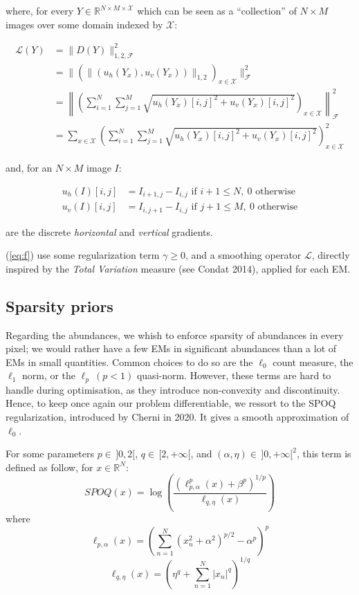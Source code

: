 \documentclass[conference]{IEEEtran}
\begin{document}
where, for every $Y \in \mathbb{R}^{N \times M \times \mathcal{X}}$ which can be seen as a ``collection'' of $N \times M$ images over some domain indexed by $\mathcal{X}$:

\begin{align}\label{eq:smoothing}
  \mathcal{L}(Y) &= \| D(Y) \|_{1,2,\mathcal{F}}^2\\
  &= \| \left( \| (u_h (Y_x), u_v (Y_x)) \|_{1,2} \right)_{x \in \mathcal{X}} \|_{\mathcal{F}}^2\\
  &= \left\| \left(\sum_{i=1}^N \sum_{j=1}^M \sqrt{ u_h (Y_{x})[i, j]^2 + u_v (Y_x)[i, j]^2 } \right)_{x \in \mathcal{X}} \right\|_{\mathcal{F}}^2\\
  &= \sum_{x \in \mathcal{X}} \left( \sum_{i=1}^N \sum_{j=1}^M \sqrt{ u_h (Y_{x})[i, j]^2 + u_v (Y_x)[i, j]^2 } \right)_{x \in \mathcal{X}}^2
\end{align}

and, for an $N \times M$ image $I$:

\begin{align}\label{eq:discrete-grad}
  u_h (I) [i, j] &= I_{i+1, j} - I_{i, j} \text{ if }i + 1 \leq N,\ 0 \text{ otherwise}\\
  u_v (I) [i, j] &= I_{i, j+1} - I_{i, j} \text{ if }j + 1 \leq M,\ 0 \text{ otherwise}
\end{align}

are the discrete \emph{horizontal} and \emph{vertical} gradients.

(\ref{eq:f}) use some regularization term $\gamma \geq 0$, and a smoothing operator $\mathcal{L}$, directly inspired by the \emph{Total Variation} measure (see Condat 2014), applied for each EM.

\subsection{Sparsity priors}

Regarding the abundances, we whish to enforce sparsity of abundances in every pixel; we would rather have a few EMs in significant abundances than a lot of EMs in small quantities. Common choices to do so are the $\ell_0$ count measure, the $\ell_1$ norm, or the $\ell_p \ (p<1)$ quasi-norm. However, these terms are hard to handle during optimisation, as they introduce non-convexity and discontinuity. Hence, to keep once again our problem differentiable, we ressort to the SPOQ regularization, introduced by Cherni in 2020. It gives a smooth approximation of $\ell_0$.

For some parameters $p\in \, ]0, 2[$, $q\in \, [2, +\infty[$, and $(\alpha, \eta) \in \, ]0, +\infty [^2$, this term is defined as follow, for $x \in \mathbb{R}^N$:
$$SPOQ(x) = \log \left( \frac{(\ell_{p,\alpha}^p (x) + \beta^p)^{1/p}}{\ell_{q,\eta} (x)} \right)$$
        where
        $$\ell_{p,\alpha} (x) = \left( \sum_{n=1}^N (x_n^2 + \alpha^2)^{p/2} - \alpha^p \right)^p$$
        $$\ell_{q,\eta} (x) = \left( \eta^q + \sum_{n=1}^N |x_n|^q \right)^{1/q}$$
\end{document}
